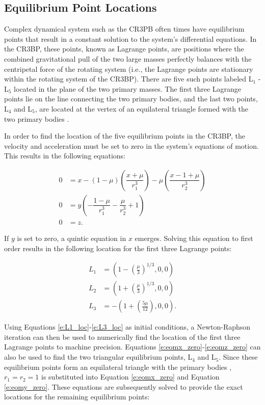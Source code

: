 \documentclass[11pt]{article} %
\begin{document}
\subsection{Equilibrium Point Locations}
Complex dynamical system such as the CR3PB often times have equilibrium points that result in a constant solution to the system's differential equations. In the CR3BP, these points, known as Lagrange points, are positions where the combined gravitational pull of the two large masses perfectly balances with the centripetal force of the rotating system (i.e., the Lagrange points are stationary within the rotating system of the CR3BP). There are five such points labeled L$_1$ - L$_5$ located in the plane of the two primary masses. The first three Lagrange points lie on the line connecting the two primary bodies, and the last two points, L$_4$ and L$_5$, are located at the vertex of an equilateral triangle formed with the two primary bodies \cite{KoonLoMarsdenRoss2011}.

In order to find the location of the five equilibrium points in the CR3BP, the velocity and acceleration must be set to zero in the system's equations of motion. This results in the following equations:

\begin{align}
	0 & = x - (1-\mu)\left(\dfrac{x+\mu}{r_1^3}\right) - \mu\left(\dfrac{x-1+\mu}{r_2^3}\right) \label{e:eomx_zero}\\
	0 & = y\left(-\dfrac{1-\mu}{r_1^3} - \dfrac{\mu}{r_2^3} + 1\right) \label{e:eomy_zero}\\
	0 & = z. \label{e:eomz_zero}
\end{align}

\noindent
If $y$ is set to zero, a quintic equation in $x$ emerges. Solving this equation to first order results in the following location for the first three Lagrange points:

\begin{align}
	L_1 &= \left(1-\left(\frac{\mu}{3}\right)^{1/3},0,0\right)\label{e:L1_loc}\\
	L_2 &= \left(1+\left(\frac{\mu}{3}\right)^{1/3},0,0\right)\label{e:L2_loc}\\
	L_3 &= -\left(1+\left(\frac{5\mu}{12}\right),0,0\right). \label{e:L3_loc}
\end{align}

\noindent
Using Equations \ref{e:L1_loc}-\ref{e:L3_loc} as initial conditions, a Newton-Raphson iteration can then be used to numerically find the location of the first three Lagrange points to machine precision. Equations \ref{e:eomx_zero}-\ref{e:eomz_zero} can also be used to find the two triangular equilibrium points, L$_4$ and L$_5$. Since these equilibrium points form an equilateral triangle with the primary bodies \cite{KoonLoMarsdenRoss2011}, $r_1 = r_2 = 1$ is substituted into Equation \ref{e:eomx_zero} and Equation \ref{e:eomy_zero}. These equations are subsequently solved to provide the exact locations for the remaining equilibrium points:
\end{document}
